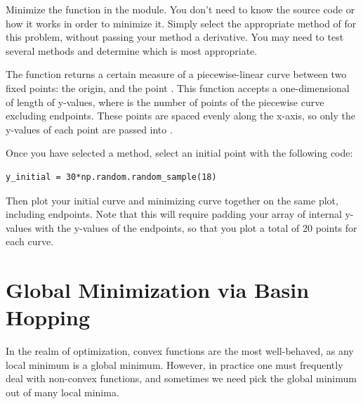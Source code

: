 \begin{problem} %
Minimize the  function in the  module. 
You don't need to know the source code or how it works in order to minimize it.
Simply select the appropriate method of  for this problem, without passing your method a derivative. 
You may need to test several methods and determine which is most appropriate.

The function  returns a certain measure of a piecewise-linear curve between two fixed points: the origin, and the point .
This function accepts a one-dimensional  of length  of y-values, where  is the number of points of the piecewise curve excluding endpoints.
These points are spaced evenly along the x-axis, so only the y-values of each point are passed into .

Once you have selected a method, select an initial point with the following code:

\begin{lstlisting}
y_initial = 30*np.random.random_sample(18)
\end{lstlisting}

Then plot your initial curve and minimizing curve together on the same plot, including endpoints.
Note that this will require padding your array of internal y-values with the y-values of the endpoints, so that you plot a total of 20 points for each curve.
\end{problem}

\section*{Global Minimization via Basin Hopping} %

In the realm of optimization, convex functions are the most well-behaved, as any local minimum is a global minimum.
However, in practice one must frequently deal with non-convex functions, and sometimes we need pick the global minimum out of many local minima.

